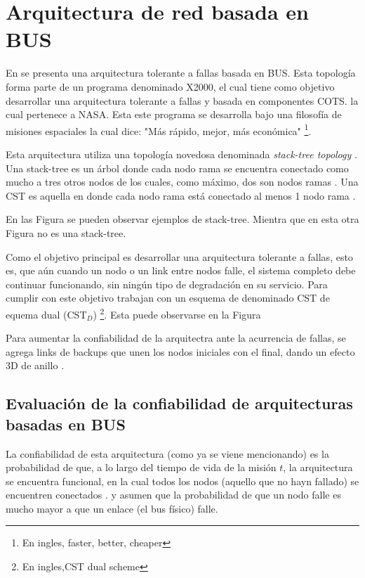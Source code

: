  \section{Arquitectura de red basada en BUS}
En \cite{Tai99} se presenta una arquitectura tolerante a fallas basada en BUS. Esta topología forma parte de un programa denominado X2000, el cual tiene como objetivo desarrollar una arquitectura tolerante a fallas y basada en componentes COTS. la cual pertenece a \ac{NASA}. Esta este programa se desarrolla bajo una filosofía de misiones espaciales la cual dice: "Más rápido, mejor, más económica" \footnote{En ingles, faster, better, cheaper}.

Esta arquitectura utiliza una topología novedosa denominada \textit{stack-tree topology} \citep{Chau99} \citep{Tai99}. Una stack-tree es un árbol donde cada nodo rama se encuentra conectado como mucho a tres otros nodos de los cuales, como máximo, dos son nodos ramas \citep{Tai99}. Una \ac{CST} es aquella en donde cada nodo rama está conectado al menos 1 nodo rama \citep{Tai99}.

En las Figura se pueden observar ejemplos de stack-tree. Mientra que en esta otra Figura no es una stack-tree.

Como el objetivo principal es desarrollar una arquitectura tolerante a fallas, esto es, que aún cuando un nodo o un link entre nodos falle, el sistema completo debe continuar funcionando, sin ningún tipo de degradación en su servicio. Para cumplir con este objetivo \cite{Tai99} trabajan con un esquema de denominado \ac{CST} de equema dual (\ac{CST}$_D$) \footnote{En ingles,\ac{CST} dual scheme}. Esta puede observarse en la Figura

Para aumentar la confiabilidad de la arquitectra ante la acurrencia de fallas, se agrega links de backups que unen los nodos iniciales con el final, dando un efecto 3D de anillo \citep{Tai99}.

\subsection{Evaluación de la confiabilidad de arquitecturas basadas en BUS}
La confiabilidad de esta arquitectura (como ya se viene mencionando) es la probabilidad de que, a lo largo del tiempo de vida de la misión $t$, la arquitectura se encuentra funcional, en la cual todos los nodos (aquello que no hayn fallado) se encuentren conectados \citep{Tai99}. \citep{Tai99} y \citep{Chau99} asumen que la probabilidad de que un nodo falle es mucho mayor a que un enlace (el bus físico) falle.

